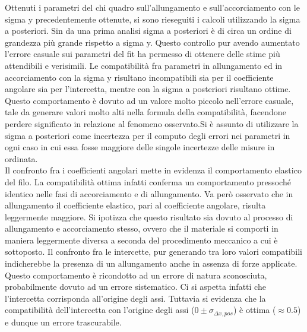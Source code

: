 \documentclass[a4paper,11pt,oneside]{article}
\begin{document}
Ottenuti i parametri del chi quadro sull'allungamento e sull'accorciamento con le sigma y precedentemente ottenute, si sono rieseguiti i calcoli utilizzando la sigma a posteriori. Sin da una prima analisi sigma a posteriori è di circa un ordine di grandezza più grande rispetto a sigma y. Questo controllo pur avendo aumentato l'errore casuale sui parametri del fit ha permesso di ottenere delle stime più attendibili e verisimili. Le compatibilità fra parametri in allungamento ed in accorciamento con la sigma y risultano incompatibili sia per il coefficiente angolare sia per l'intercetta, mentre con la sigma a posteriori risultano ottime. Questo comportamento è dovuto ad un valore molto piccolo nell'errore casuale, tale da generare valori molto alti nella formula della compatibilità, facendone perdere significato in relazione al fenomeno osservato.Si è assunto di utilizzare la sigma a posteriori come incertezza per il computo degli errori nei parametri in ogni caso in cui essa fosse maggiore delle singole incertezze delle misure in ordinata.\\
Il confronto fra i coefficienti angolari mette in evidenza il comportamento elastico del filo. La compatibilità ottima infatti conferma un comportamento pressoché identico nelle fasi di accorciamento e di allungamento. Va però osservato che in allungamento il coefficiente elastico, pari al coefficiente angolare, risulta leggermente maggiore. Si ipotizza che questo risultato sia dovuto al processo di allungamento e accorciamento stesso, ovvero che il materiale si comporti in maniera leggermente diversa a seconda del procedimento meccanico a cui è sottoposto.
Il confronto fra le intercette, pur generando tra loro valori compatibili indicherebbe la presenza di un allungamento anche in assenza di forze applicate. Questo comportamento è ricondotto ad un errore di natura sconosciuta, probabilmente dovuto ad un errore sistematico. Ci si aspetta infatti che l'intercetta corrisponda all'origine degli assi. Tuttavia si evidenza che la compatibilità dell'intercetta con l'origine degli assi ($0\pm \sigma_{\Delta x, pos}$) è ottima ($\approx \num{0.5}$) e dunque un errore trascurabile.
\end{document}
